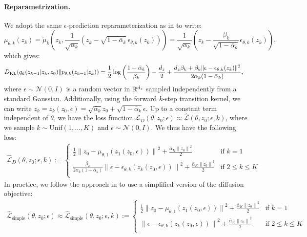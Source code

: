 \paragraph{Reparametrization.} We adopt the same $\epsilon$-prediction reparameterization as in \citet{hodenoisingdiffusionprobabilistic2020} to write:
\[
\mu_{\theta, k}({z}_k) = \tilde{\mu}_k \left( {z}_k, \frac{1}{\sqrt{\alpha_k}} \left( {z}_k - \sqrt{1 - \bar{\alpha}_k} \, \epsilon_{\theta, k}({z}_k) \right) \right) 
= \frac{1}{\sqrt{\alpha_k}} \left( {z}_k - \frac{\beta_k}{\sqrt{1 - \bar{\alpha}_k}} \epsilon_{\theta, k}({z}_k) \right),
\]
which gives:
\begin{align}
        D_{\mathrm{KL}} ({q_k(z_{k-1}| z_{k}, z_0)}\|{p_{\theta, k}(z_{k-1}|z_k)}) &=\frac{1}{2}\log\left(\frac{1-\bar{\alpha}_k}{{\beta}_k}\right)-\frac{d_z}{2}+\frac{d_z{\beta}_k+\beta_k\|\epsilon-\epsilon_{\theta, k}(z_k)\|^2}{2 \alpha_k (1-\bar{\alpha}_k)},
\end{align}
where $\epsilon \sim \mathcal{N}(0, I)$ is a random vector in $\mathbb{R}^{d_z}$ sampled independently from a standard Gaussian. Additionally, using the forward $k$-step transition kernel, we can write $z_k = z_k(z_0, \epsilon)=\sqrt{\bar{\alpha}_k}z_0+\sqrt{1-\bar{\alpha}_k}\epsilon$. Up to a constant term independent of $\theta$, we have the loss function $\mathcal{L}_D(\theta, z_0; \epsilon)\approx \hat{\mathcal{L}}(\theta,z_0;\epsilon, k)$, where we sample $k \sim \text{Unif}(1, \ldots, K)$ and $\epsilon \sim \mathcal{N}(0, I)$. We thus have the following loss:
\begin{align}\label{app_eq:diffusion_likelihood}
    \hat{\mathcal{L}}_D(\theta,z_0;\epsilon, k):=\left\{
    \begin{array}{ll}\frac{1}{2}\|{z_0-\mu_{\theta,1}(z_1(z_0,\epsilon))\|}^2 + \frac{\bar{\alpha}_K\|{z_0\|}^2}{2}&\text{if }k=1\\
    \frac{\beta_k}{2\alpha_k(1-\bar{\alpha}_k)}\|{\epsilon-\epsilon_{\theta,k}(z_k(z_0,\epsilon))\|}^2 + \frac{\bar{\alpha}_K\|{z_0\|}^2}{2}&\text{if }2\leq k\leq K\\
    \end{array}
    \right.
\end{align}
In practice, we follow the approach in \citet{hodenoisingdiffusionprobabilistic2020} to use a simplified version of the diffusion objective:
\begin{align}\label{app:one_sample_simplified_diffusion}
    \hat{\mathcal{L}}_{\text{simple}}(\theta, z_0; \epsilon)\approx \hat{\mathcal{L}}_{\text{simple}}(\theta,z_0;\epsilon, k):=\left\{
    \begin{array}{ll}\frac{1}{2}\|{z_0-\mu_{\theta,1}(z_1(z_0,\epsilon))\|}^2 + \frac{\bar{\alpha}_K\|{z_0\|}^2}{2}&\text{if }k=1\\
    \|{\epsilon-\epsilon_{\theta,k}(z_k(z_0,\epsilon))\|}^2 + \frac{\bar{\alpha}_K\|{z_0\|}^2}{2}&\text{if }2\leq k\leq K\\
    \end{array}
    \right.
\end{align}

